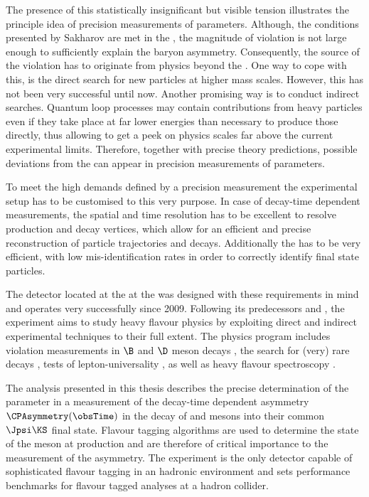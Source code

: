 The presence of this statistically insignificant but visible tension illustrates
the principle idea of precision measurements of \CKM parameters. Although, the
conditions presented by Sakharov are met in the \SM, the magnitude of \CP
violation is not large enough to sufficiently explain the baryon asymmetry.
Consequently, the source of the \CP violation has to originate from physics
beyond the \SM. One way to cope with this, is the direct search for new
particles at higher mass scales. However, this has not been very successful
until now. Another promising way is to conduct indirect searches. Quantum loop
processes may contain contributions from heavy particles even if they take place
at far lower energies than necessary to produce those directly, thus allowing to
get a peek on physics scales far above the current experimental limits.
Therefore, together with precise theory predictions, possible deviations from
the \SM can appear in precision measurements of \SM parameters.

To meet the high demands defined by a precision measurement the experimental
setup has to be customised to this very purpose. In case of decay-time dependent
measurements, the spatial and time resolution has to be excellent to resolve
production and decay vertices, which allow for an efficient and precise
reconstruction of particle trajectories and decays. Additionally the \PID has to
be very efficient, with low mis-identification rates in order to correctly
identify final state particles.

The \LHCb detector located at the \LHC at the \CERN was designed with these
requirements in mind and operates very successfully since 2009. Following its
predecessors \Babar and \Belle, the \LHCb experiment aims to study heavy flavour
physics by exploiting direct and indirect experimental techniques to their full
extent. The physics program includes \CP violation measurements in $\B$ and $\D$
meson decays
\cite{Aaij:2015tza,Aaij:2015yda,Aaij:2014uva,Aaij:2014fba,Aaij:2014dka,Aaij:2014zsa,Aaij:2014kxa}, 
the search for (very) rare decays \cite{CMS:2014xfa}, tests of
lepton-universality \cite{Aaij:2014ora,Aaij:2015yra}, as well as heavy flavour
spectroscopy \cite{Aaij:2014yka,Aaij:2015tga}.

The analysis presented in this thesis describes the precise determination of the
\CKM parameter \sintwobeta in a measurement of the decay-time dependent \CP
asymmetry $\CPAsymmetry(\obsTime)$ in the decay of \Bd and \Bdbar mesons into
their common $\Jpsi\KS$ final state. Flavour tagging algorithms are used to
determine the state of the \B meson at production and are therefore of critical
importance to the measurement of the \CP asymmetry. The \LHCb experiment is the
only detector capable of sophisticated flavour tagging in an hadronic
environment and sets performance benchmarks for flavour tagged \CP analyses at a
hadron collider.

